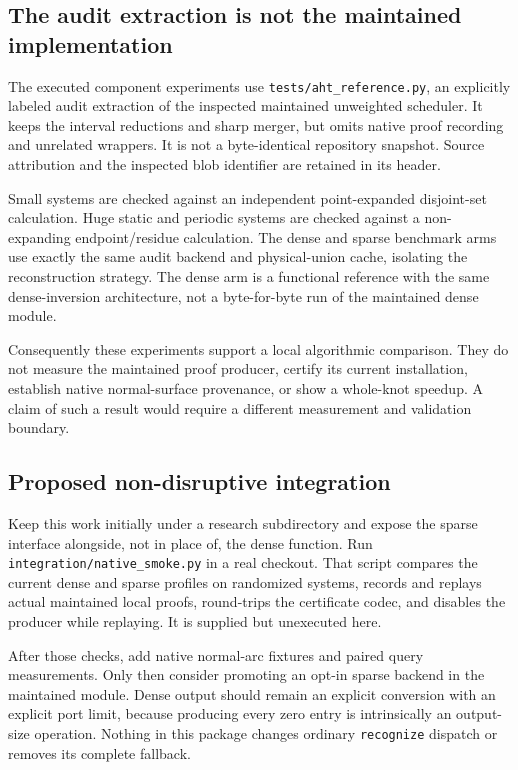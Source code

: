 \documentclass[11pt]{article}
\theoremstyle{definition}
\begin{document}
\subsection{The audit extraction is not the maintained implementation}
The executed component experiments use \texttt{tests/aht\_reference.py},
an explicitly labeled audit extraction of the inspected maintained
unweighted scheduler. It keeps the interval reductions and sharp merger,
but omits native proof recording and unrelated wrappers. It is not a
byte-identical repository snapshot. Source attribution and the inspected
blob identifier are retained in its header.

Small systems are checked against an independent point-expanded disjoint-set
calculation. Huge static and periodic systems are checked against a
non-expanding endpoint/residue calculation. The dense and sparse benchmark
arms use exactly the same audit backend and physical-union cache, isolating
the reconstruction strategy. The dense arm is a functional reference with
the same dense-inversion architecture, not a byte-for-byte run of the
maintained dense module.

Consequently these experiments support a local algorithmic comparison.
They do not measure the maintained proof producer, certify its current
installation, establish native normal-surface provenance, or show a
whole-knot speedup. A claim of such a result would require a different
measurement and validation boundary.

\subsection{Proposed non-disruptive integration}
Keep this work initially under a research subdirectory and expose the
sparse interface alongside, not in place of, the dense function. Run
\texttt{integration/native\_smoke.py} in a real checkout. That script compares
the current dense and sparse profiles on randomized systems, records and
replays actual maintained local proofs, round-trips the certificate codec,
and disables the producer while replaying. It is supplied but unexecuted
here.

After those checks, add native normal-arc fixtures and paired query
measurements. Only then consider promoting an opt-in sparse backend in the
maintained module. Dense output should remain an explicit conversion with
an explicit port limit, because producing every zero entry is intrinsically
an output-size operation. Nothing in this package changes ordinary
\texttt{recognize} dispatch or removes its complete fallback.
\end{document}
